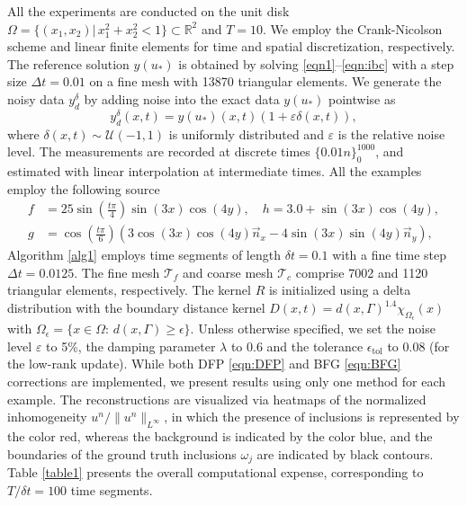 \documentclass[onefignum,onetabnum]{siamart190516}
\numberwithin{equation}{section}
\begin{document}
All the experiments are conducted on the unit disk $\Omega = \{(x_{1}, x_{2})|\,x_{1}^{2}+x_{2}^{2}< 1\} \subset \mathbb{R}^2$ and $T=10$.
We employ the Crank-Nicolson scheme and linear finite elements for time and spatial discretization, respectively.
The reference solution $y(u_*)$ is obtained by solving \eqref{eqn1}--\eqref{eqn:ibc} with a step size $\Delta t = 0.01$ on a fine mesh with 13870 triangular elements.
We generate the noisy data $y_d^\delta$ by adding noise into the exact data $y(u_{*})$ pointwise as
\begin{equation*}
y_d^\delta(x,t) = y(u_*)(x,t)\left(1 + \varepsilon \delta(x,t)\right),
\end{equation*}
where $\delta(x,t) \sim \mathcal{U}(-1,1)$ is uniformly distributed and $\varepsilon$ is the relative noise level.
The measurements are recorded at discrete times $\{0.01n\}_{0}^{1000}$, and estimated with linear interpolation at intermediate times.
All the examples employ the following source
\begin{align*}
f &= 25\sin\left(\tfrac{t\pi}{4}\right)\sin(3x)\cos(4y), \quad h = 3.0 + \sin(3x)\cos(4y),\\
g &= \cos\left(\tfrac{t\pi}{6}\right)\left(3\cos(3x)\cos(4y)\vec{n}_{x} - 4\sin(3x)\sin(4y)\vec{n}_{y}\right),
\end{align*}
Algorithm \ref{alg1} employs time segments of length $\delta t = 0.1$ with a fine time step $\Delta t = 0.0125$.
The fine mesh $\mathscr{T}_f$ and coarse mesh $\mathscr{T}_c$ comprise 7002 and 1120 triangular elements, respectively.
The kernel $R$ is initialized using a delta distribution with the boundary distance kernel $D(x,t) = d(x,\Gamma)^{1.4}\chi_{\Omega_{\epsilon}}(x)$ with $\Omega_{\epsilon}=\{x\in \Omega:\,d(x,\Gamma)\geq \epsilon\}$.
Unless otherwise specified, we set the noise level $\varepsilon$ to 5\%, the damping parameter $\lambda$ to 0.6 and the tolerance $\epsilon_{\text{tol}}$ to 0.08 (for the low-rank update).
While both DFP \eqref{eqn:DFP} and BFG \eqref{eqn:BFG} corrections are implemented, we present results using only one method for each example.
The reconstructions are visualized via heatmaps of the normalized inhomogeneity ${u^n}/{\|u^n\|_{L^\infty}}$, in which the presence of inclusions is represented by the color red, whereas the background is indicated by the color blue, and the boundaries of the ground truth inclusions $\omega_{j}$ are indicated by black contours.
Table \ref{table1} presents the overall computational expense, corresponding to $T/\delta t=100$ time segments.
\end{document}
